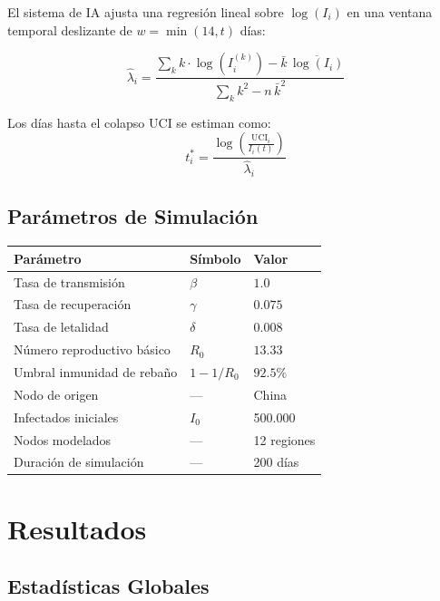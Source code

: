 \documentclass[12pt,a4paper]{article}
\begin{document}
El sistema de IA ajusta una regresión lineal sobre $\log(I_i)$ en una ventana temporal
deslizante de $w = \min(14, t)$ días:

\begin{equation}
    \hat{\lambda}_i = \frac{\sum_{k} k \cdot \log(I_i^{(k)}) - \bar{k}\,\overline{\log(I_i)}}{\sum_{k} k^2 - n\,\bar{k}^2}
    \label{eq:growth_rate}
\end{equation}

Los días hasta el colapso UCI se estiman como:
\begin{equation}
    t^*_i = \frac{\log\!\left(\frac{\text{UCI}_i}{I_i(t)}\right)}{\hat{\lambda}_i}
    \label{eq:collapse}
\end{equation}

\subsection{Parámetros de Simulación}

\begin{center}
\begin{tabular}{lll}
\toprule
\textbf{Parámetro} & \textbf{Símbolo} & \textbf{Valor} \\
\midrule
Tasa de transmisión          & $\beta$  & $1.0$ \\
Tasa de recuperación         & $\gamma$ & $0.075$ \\
Tasa de letalidad            & $\delta$ & $0.008$ \\
Número reproductivo básico   & $R_0$    & $13.33$ \\
Umbral inmunidad de rebaño   & $1-1/R_0$ & $92.5\%$ \\
Nodo de origen               & —        & China \\
Infectados iniciales         & $I_0$    & 500.000 \\
Nodos modelados              & —        & 12 regiones \\
Duración de simulación       & —        & 200 días \\
\bottomrule
\end{tabular}
\end{center}

\section{Resultados}

\subsection{Estadísticas Globales}
\end{document}
